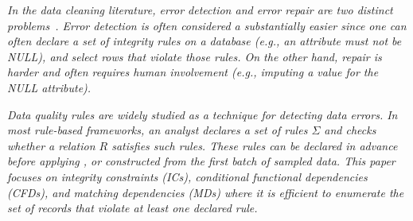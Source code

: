 \emph{In the data cleaning literature, error detection and error repair are two distinct problems~\cite{DBLP:series/synthesis/2012Fan, Dasu:2003:EDM:861869, rahm2000data}.
Error detection is often considered a substantially easier since one can often declare a set of integrity rules on a database (e.g., an attribute must not be NULL), and select rows that violate those rules.
On the other hand, repair is harder and often requires human involvement (e.g., imputing a value for the NULL attribute).}

\vspace{0.5em}

\emph{Data quality rules are widely studied as a technique for detecting data errors.
In most rule-based frameworks, an analyst declares a set of rules $\Sigma$ and checks whether a relation $R$ satisfies such rules.
These rules can be declared in advance before applying \sys, or constructed from the first batch of sampled data.
This paper focuses on integrity constraints (ICs), conditional functional dependencies (CFDs), and matching dependencies (MDs) where it is efficient to enumerate the set of records that violate at least one declared rule. }